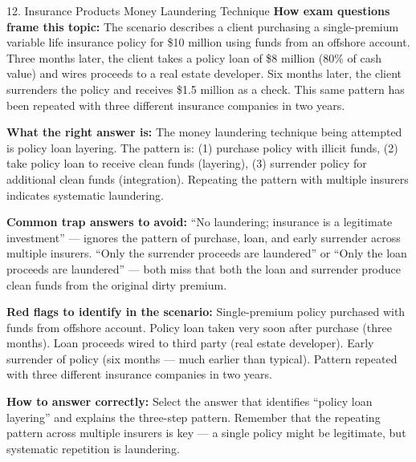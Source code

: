 \documentclass[11pt,a4paper]{beamer}
\begin{document}
	\begin{frame}{12. Insurance Products Money Laundering Technique}
		\tiny
		\noindent\textbf{How exam questions frame this topic:} The scenario describes a client purchasing a single-premium variable life insurance policy for \$10 million using funds from an offshore account. Three months later, the client takes a policy loan of \$8 million (80\% of cash value) and wires proceeds to a real estate developer. Six months later, the client surrenders the policy and receives \$1.5 million as a check. This same pattern has been repeated with three different insurance companies in two years.
		
		\vspace{0.1cm}
		\noindent\textbf{What the right answer is:} The money laundering technique being attempted is policy loan layering. The pattern is: (1) purchase policy with illicit funds, (2) take policy loan to receive clean funds (layering), (3) surrender policy for additional clean funds (integration). Repeating the pattern with multiple insurers indicates systematic laundering.
		
		\vspace{0.1cm}
		\noindent\textbf{Common trap answers to avoid:} “No laundering; insurance is a legitimate investment” — ignores the pattern of purchase, loan, and early surrender across multiple insurers. “Only the surrender proceeds are laundered” or “Only the loan proceeds are laundered” — both miss that both the loan and surrender produce clean funds from the original dirty premium.
		
		\vspace{0.1cm}
		\noindent\textbf{Red flags to identify in the scenario:} Single-premium policy purchased with funds from offshore account. Policy loan taken very soon after purchase (three months). Loan proceeds wired to third party (real estate developer). Early surrender of policy (six months — much earlier than typical). Pattern repeated with three different insurance companies in two years.
		
		\vspace{0.1cm}
		\noindent\textbf{How to answer correctly:} Select the answer that identifies “policy loan layering” and explains the three-step pattern. Remember that the repeating pattern across multiple insurers is key — a single policy might be legitimate, but systematic repetition is laundering.
	\end{frame}
	
\end{document}
